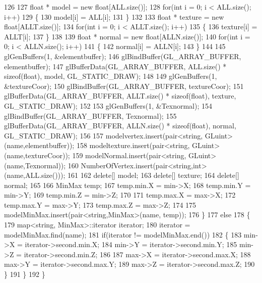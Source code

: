 \begin{DoxyCode}
126         
127         \textcolor{keywordtype}{float} * model = \textcolor{keyword}{new} \textcolor{keywordtype}{float}[ALL.size()];
128         \textcolor{keywordflow}{for}(\textcolor{keywordtype}{int} i = 0; i < ALL.size(); i++)
129         \{
130             model[i] = ALL[i];
131         \}
132 
133         \textcolor{keywordtype}{float} * texture = \textcolor{keyword}{new} \textcolor{keywordtype}{float}[ALLT.size()];
134         \textcolor{keywordflow}{for}(\textcolor{keywordtype}{int} i = 0; i < ALLT.size(); i++)
135         \{
136             texture[i] = ALLT[i];
137         \}
138 
139         \textcolor{keywordtype}{float} * normal = \textcolor{keyword}{new} \textcolor{keywordtype}{float}[ALLN.size()];
140         \textcolor{keywordflow}{for}(\textcolor{keywordtype}{int} i = 0; i < ALLN.size(); i++)
141         \{
142             normal[i] = ALLN[i];
143         \}
144 
145         glGenBuffers(1, &elementbuffer);
146         glBindBuffer(GL_ARRAY_BUFFER, elementbuffer);
147         glBufferData(GL_ARRAY_BUFFER, ALL.size() * \textcolor{keyword}{sizeof}(float), model, 
      GL_STATIC_DRAW);
148     
149         glGenBuffers(1, &textureCoor);
150         glBindBuffer(GL_ARRAY_BUFFER, textureCoor);
151         glBufferData(GL_ARRAY_BUFFER, ALLT.size() * \textcolor{keyword}{sizeof}(float), texture, 
      GL_STATIC_DRAW);
152 
153         glGenBuffers(1, &Texnormal);
154         glBindBuffer(GL_ARRAY_BUFFER, Texnormal);
155         glBufferData(GL_ARRAY_BUFFER, ALLN.size() * \textcolor{keyword}{sizeof}(float), normal, 
      GL_STATIC_DRAW);
156 
157         modelvertex.insert(pair<string, GLuint>(name,elementbuffer));
158         modeltexture.insert(pair<string, GLuint>(name,textureCoor));
159         modelNormal.insert(pair<string, GLuint>(name,Texnormal));
160         NumberOfVertex.insert(pair<string,int>(name,ALL.size()));
161 
162         \textcolor{keyword}{delete}[] model;
163         \textcolor{keyword}{delete}[] texture;
164         \textcolor{keyword}{delete}[] normal;
165 
166         MinMax temp;
167         temp.min.X = min->X;
168         temp.min.Y = min->Y;
169         temp.min.Z = min->Z;
170 
171         temp.max.X = max->X;
172         temp.max.Y = max->Y;
173         temp.max.Z = max->Z;
174 
175         modelMinMax.insert(pair<string,MinMax>(name, temp));
176     \}
177     \textcolor{keywordflow}{else}
178     \{
179         map<string, MinMax>::iterator iterator;
180         iterator = modelMinMax.find(name);
181         \textcolor{keywordflow}{if}(iterator != modelMinMax.end())
182         \{
183             min->X = iterator->second.min.X;
184             min->Y = iterator->second.min.Y;
185             min->Z = iterator->second.min.Z;
186 
187             max->X = iterator->second.max.X;
188             max->Y = iterator->second.max.Y;
189             max->Z = iterator->second.max.Z;
190         \}
191     \}
192 \}
\end{DoxyCode}


